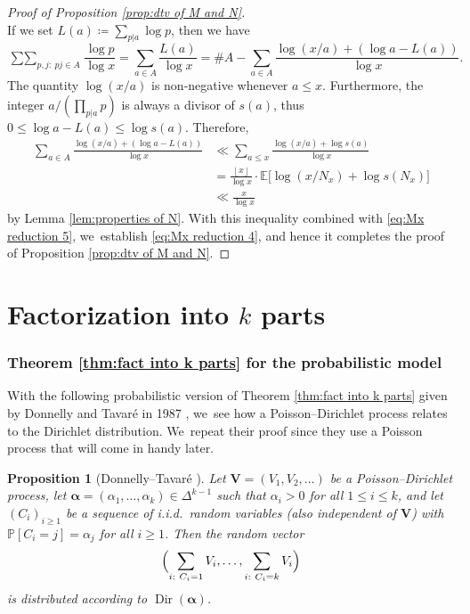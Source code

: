 \documentclass[JEP,XML,SOM,Unicode,published]{cedram}
\newcommand{\bV}{{\boldsymbol V}}
\newcommand{\PP}{\mathbb{P}}
\newcommand{\EE}{\mathbb{E}}
\newcommand{\boldalpha}{\boldsymbol{\alpha}}
\newcommand{\floor}[1]{\left\lfloor #1 \right\rfloor}
\newcommand{\simplex}{\Delta^{k-1}}
\newcommand{\bg}{\big}
\DeclareMathOperator{\Dir}{Dir}
\theoremstyle{plain}
\newtheorem{prop}[cor]{Proposition}
\theoremstyle{definition}
\begin{document}
\begin{proof}[Proof of Proposition \ref{prop:dtv of M and N}]
\begin{equation}
\end{equation}
If we set $L(a)\coloneqq \sum_{p|a}\log p$, then we have
\begin{equation}
\label{eq:Mx reduction 5}
\mathop{\sum\sum}_{p,j:\ pj \in A} \frac{\log p}{\log x} = \sum_{a\in A}\frac{L(a)}{\log x} = \# A
- \sum_{a\in A} \frac{\log(x/a) + (\log a - L(a))}{\log x}.
\end{equation}
The quantity $\log(x/a)$ is non-negative whenever $a \le x$. Furthermore, the integer $a/(\prod_{p|a} p)$ is always a divisor of $s(a)$, thus $0 \le \log a - L(a) \le \log s(a)$. Therefore,
\begin{align*}
\sum_{a\in A} \frac{\log(x/a) + (\log a - L(a))}{\log x} &\ll \sum_{a\le x} \frac{\log(x/a) + \log s(a)}{\log x} \\
&= \frac{\floor x}{\log x} \cdot \EE\bg[\log(x/N_x) + \log s(N_x)\bg] \\
&\ll \frac{x}{\log x}
\end{align*}
by Lemma \ref{lem:properties of N}. With this inequality combined with \eqref{eq:Mx reduction 5}, we~establish \eqref{eq:Mx reduction 4}, and hence it completes the proof of Proposition \ref{prop:dtv of M and N}.
\end{proof}

\part{Factorization into \texorpdfstring{$k$}{k} parts}\label{part:DDT}

\section{Theorem \ref{thm:fact into k parts} for the probabilistic model}\label{sec:Donnelly-Tavare}

With the following probabilistic version of Theorem \ref{thm:fact into k parts} given by Donnelly and Tavaré in 1987 \cite[\S 3]{DonnellyTavare87}, we~see how a Poisson--Dirichlet process relates to the Dirichlet distribution. We~repeat their proof since they use a Poisson process that will come in handy later.

\begin{prop}[Donnelly--Tavaré \cite{DonnellyTavare87}]
\label{prop:probabilistic dirichlet law}
Let $\bV = (V_1, V_2, \ldots)$ be a Poisson--Dirichlet process, let $\boldalpha = (\alpha_1, \ldots, \alpha_k) \in \simplex$ such that $\alpha_i > 0$ for all $1 \le i \le k$, and let $(C_i)_{i \ge 1}$ be a sequence of i.i.d.~random variables (also independent of $\bV$) with $\PP[C_i = j] = \alpha_j$ for all $i \ge 1$. Then the random vector
\[
\Bigl(\sum_{i:\ C_i = 1} V_i, \ldots, \sum_{i:\ C_i = k} V_i\Bigr)
\]
is distributed according to $\Dir(\boldalpha)$.
\end{prop}
\end{document}
